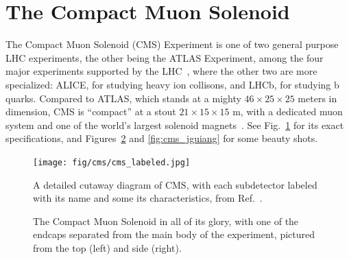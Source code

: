 \clearpage

\section{The Compact Muon Solenoid}
The Compact Muon Solenoid (CMS) Experiment is one of two general purpose LHC experiments, the other being the ATLAS\footnotemark{} Experiment, among the four major experiments supported by the LHC~\cite{LHCWeb}, where the other two are more specialized: ALICE, for studying heavy ion collisons, and LHCb, for studying b quarks. 
Compared to ATLAS, which stands at a mighty $46\times25\times25$ meters in dimension, CMS is ``compact'' at a stout $21\times15\times15$ m, with a dedicated muon system and one of the world's largest solenoid magnets~\cite{ATLASWeb, CMSWeb}. 
See Fig.~\ref{fig:cms_labeled} for its exact specifications, and Figures~\ref{fig:cms_pics} and \ref{fig:cms_jguiang} for some beauty shots. 

\begin{figure}[htb]
    \centering
    \texttt{[image: fig/cms/cms\_labeled.jpg]}
    \caption{
        A detailed cutaway diagram of CMS, with each subdetector labeled with its name and some its characteristics, from Ref.~\cite{Sakuma:2665537}. 
    }
    \label{fig:cms_labeled}
\end{figure}

\begin{figure}[htb]
    \centering
    \quad
    \caption{
        The Compact Muon Solenoid in all of its glory, with one of the endcaps separated from the main body of the experiment, pictured from the top (left) and side (right). 
    }
    \label{fig:cms_pics}
\end{figure}

